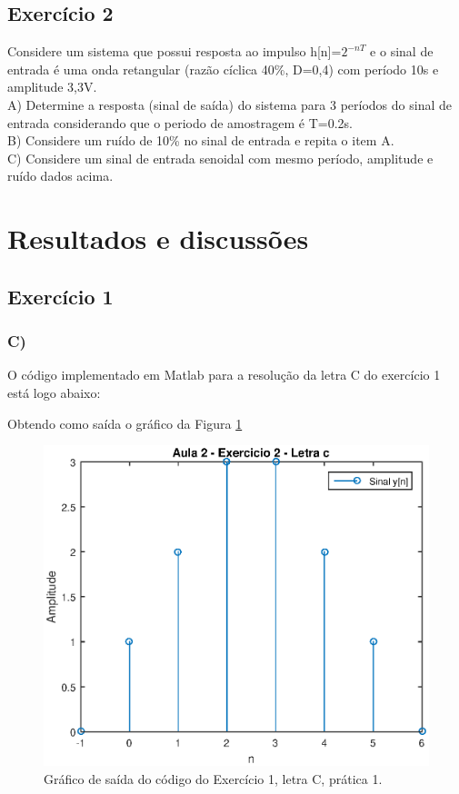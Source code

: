 \subsection{Exercício 2}
Considere um sistema que possui resposta
ao impulso h[n]=$2^{-nT}$ e o sinal de entrada é uma onda
retangular (razão cíclica 40\%, D=0,4) com período
10s e amplitude 3,3V.\\
A) Determine a resposta (sinal de saída) do sistema para
3 períodos do sinal de entrada considerando que o
periodo de amostragem é T=0.2s.\\
B) Considere um ruído de 10\% no sinal de entrada e
repita o item A.\\
C) Considere um sinal de entrada senoidal com mesmo
período, amplitude e ruído dados acima.

\section{Resultados e discussões}

\subsection{Exercício 1}
\subsubsection{C)}
O código implementado em Matlab para a resolução da letra C do exercício 1 está logo abaixo:


Obtendo como saída o gráfico da Figura \ref{saida_ex1_pr_1}

\begin{figure}
	\centering
    \includegraphics[scale = .7]{Imagens/Aula_3_exercicio1_LetraC.eps}
    \caption{Gráfico de saída do código do Exercício 1, letra C, prática 1.}
    \label{saida_ex1_pr_1}
\end{figure}

